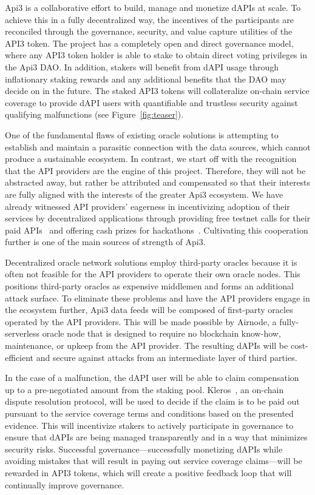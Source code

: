 \documentclass[11pt]{article}
\begin{document}
Api3 is a collaborative effort to build, manage and monetize dAPIs at scale.
To achieve this in a fully decentralized way, the incentives of the participants are reconciled through the governance, security, and value capture utilities of the API3 token.
The project has a completely open and direct governance model, where any API3 token holder is able to stake to obtain direct voting privileges in the Api3 DAO.
In addition, stakers will benefit from dAPI usage through inflationary staking rewards and any additional benefits that the DAO may decide on in the future.
The staked API3 tokens will collateralize on-chain service coverage to provide dAPI users with quantifiable and trustless security against qualifying malfunctions (see Figure~\ref{fig:teaser}).

One of the fundamental flaws of existing oracle solutions is attempting to establish and maintain a parasitic connection with the data sources, which cannot produce a sustainable ecosystem.
In contrast, we start off with the recognition that the API providers are the engine of this project.
Therefore, they will not be abstracted away, but rather be attributed and compensated so that their interests are fully aligned with the interests of the greater Api3 ecosystem.
We have already witnessed API providers’ eagerness in incentivizing adoption of their services by decentralized applications through providing free testnet calls for their paid APIs~\cite{honeycomb.market} and offering cash prizes for hackathons~\cite{honeycomb-hackathon}.
Cultivating this cooperation further is one of the main sources of strength of Api3.

Decentralized oracle network solutions employ third-party oracles because it is often not feasible for the API providers to operate their own oracle nodes.
This positions third-party oracles as expensive middlemen and forms an additional attack surface.
To eliminate these problems and have the API providers engage in the ecosystem further, Api3 data feeds will be composed of first-party oracles operated by the API providers.
This will be made possible by Airnode, a fully-serverless oracle node that is designed to require no blockchain know-how, maintenance, or upkeep from the API provider.
The resulting dAPIs will be cost-efficient and secure against attacks from an intermediate layer of third parties.

In the case of a malfunction, the dAPI user will be able to claim compensation up to a pre-negotiated amount from the staking pool.
Kleros~\cite{kleros:2019}, an on-chain dispute resolution protocol, will be used to decide if the claim is to be paid out pursuant to the service coverage terms and conditions based on the presented evidence.
This will incentivize stakers to actively participate in governance to ensure that dAPIs are being managed transparently and in a way that minimizes security risks.
Successful governance---successfully monetizing dAPIs while avoiding mistakes that will result in paying out service coverage claims---will be rewarded in API3 tokens, which will create a positive feedback loop that will continually improve governance.
\end{document}
